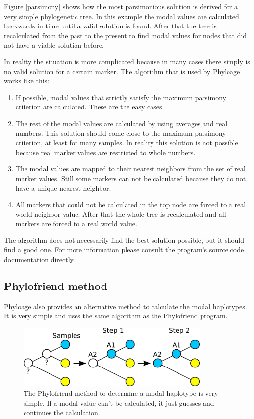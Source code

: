 Figure \ref{parsimony} shows how the most parsimonious solution
is derived for a very simple phylogenetic tree. In this 
example the modal values are calculated backwards in time until
a valid solution is found. After that the tree is recalculated
from the past to the present to find modal values for nodes that
did not have a viable solution before.

In reality the situation is more complicated because in many
cases there simply is no valid solution for a certain marker.
The algorithm that is used by Phyloage works like this:

\begin{enumerate}
\item If possible, modal values that strictly satisfy the
	maximum parsimony criterion are calculated. These are
	the easy cases.
\item The rest of the modal values are calculated by using
	averages and real numbers. This solution should come
	close to the maximum parsimony criterion, at least for
	many samples. In reality this solution is not possible
	because real marker values are restricted to whole numbers.
\item The modal values are mapped to their nearest neighbors
	from the set of real marker values. Still some markers
	can not be calculated because they do not have a unique
	nearest neighbor.
\item All markers that could not be calculated in the top
	node are forced to a real world neighbor value. After
	that the whole tree is recalculated and all markers are
	forced to a real world value.
\end{enumerate}

The algorithm does not necessarily find the best solution
possible, but it should find a good one. For more information
please consult the program's source code documentation
\cite{PhyloageSourceDoc} directly.


\subsection{Phylofriend method}

Phyloage also provides an alternative method to calculate
the modal haplotypes. It is very simple and uses the same
algorithm as the Phylofriend \cite{Phylofriend} program.

\begin{figure}[ht]
\centering
\includegraphics[width=9.5cm]{img/phylofriend.png}
\caption{\label{phylofriend} The Phylofriend method to
determine a modal haplotype is very simple. If a modal
value can't be calculated, it just guesses and continues
the calculation.}
\end{figure}

